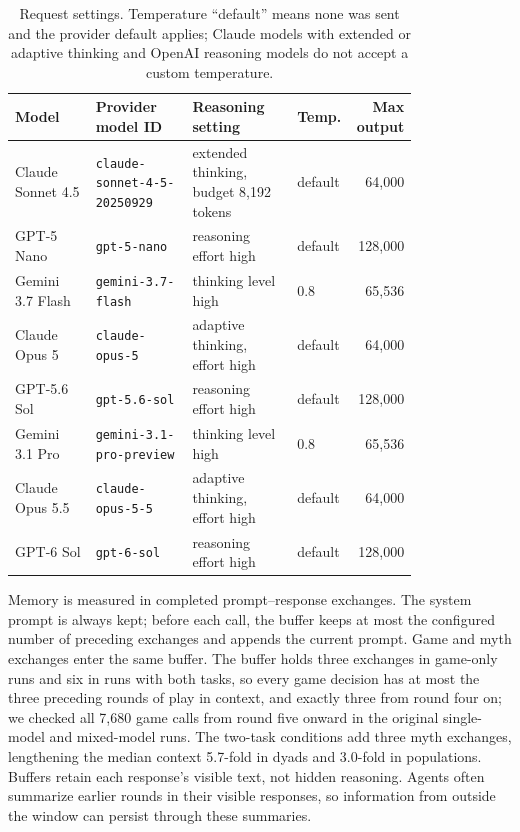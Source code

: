 \begin{table}[t]
\centering
\small
\caption{Request settings. Temperature ``default'' means none was sent and the provider default applies; Claude models with extended or adaptive thinking and OpenAI reasoning models do not accept a custom temperature.}
\label{tab:protocol-models}
\begin{tabular}{p{0.2\linewidth}p{0.24\linewidth}p{0.26\linewidth}p{0.1\linewidth}r}
\toprule
Model & Provider model ID & Reasoning setting & Temp. & Max output \\
\midrule
Claude Sonnet 4.5 & \texttt{claude-sonnet-4-5-20250929} & extended thinking, budget 8{,}192 tokens & default & 64{,}000 \\
GPT-5 Nano & \texttt{gpt-5-nano} & reasoning effort high & default & 128{,}000 \\
Gemini 3.7 Flash & \texttt{gemini-3.7-flash} & thinking level high & 0.8 & 65{,}536 \\
\addlinespace
Claude Opus 5 & \texttt{claude-opus-5} & adaptive thinking, effort high & default & 64{,}000 \\
GPT-5.6 Sol & \texttt{gpt-5.6-sol} & reasoning effort high & default & 128{,}000 \\
Gemini 3.1 Pro & \texttt{gemini-3.1-pro-preview} & thinking level high & 0.8 & 65{,}536 \\
\addlinespace
Claude Opus 5.5 & \texttt{claude-opus-5-5} & adaptive thinking, effort high & default & 64{,}000 \\
GPT-6 Sol & \texttt{gpt-6-sol} & reasoning effort high & default & 128{,}000 \\
\bottomrule
\end{tabular}
\end{table}

Memory is measured in completed prompt--response exchanges. The system prompt is always kept; before each call, the buffer keeps at most the configured number of preceding exchanges and appends the current prompt. Game and myth exchanges enter the same buffer. The buffer holds three exchanges in game-only runs and six in runs with both tasks, so every game decision has at most the three preceding rounds of play in context, and exactly three from round four on; we checked all 7,680 game calls from round five onward in the original single-model and mixed-model runs. The two-task conditions add three myth exchanges, lengthening the median context 5.7-fold in dyads and 3.0-fold in populations. Buffers retain each response's visible text, not hidden reasoning. Agents often summarize earlier rounds in their visible responses, so information from outside the window can persist through these summaries.

